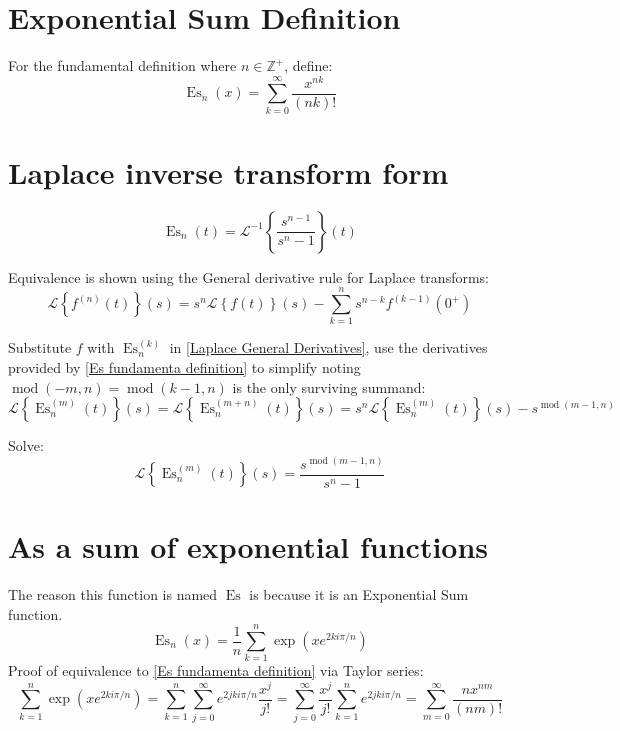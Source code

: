 \documentclass[]{article}
\DeclareMathOperator{\es}{Es}
\DeclareMathOperator{\md}{mod}
\newcommand{\pqty}[1]{{\left(#1\right)}}
\newcommand{\Bqty}[1]{{\left\{#1\right\}}}
\newcommand{\laplace}[1]{\mathcal{L}\Bqty{#1}\pqty{s}}
\newcommand{\laplaceInv}[1]{\mathcal{L}^{-1}\Bqty{#1}\pqty{t}}
\begin{document}
	\section{Exponential Sum Definition}
	For the fundamental definition where \(n\in\mathbb{Z}^+\), define:
	\begin{equation}
	\label{Es fundamenta definition}
	\es_n\pqty{x}=
	\sum_{k=0}^{\infty}\frac{x^{nk}}{\pqty{nk}!}
	\end{equation}
	
	\section{Laplace inverse transform form}
	\begin{equation}
	\es_n\pqty{t}=
	\laplaceInv{\frac{s^{n-1}}{s^n-1}}
	\end{equation}
	
	Equivalence is shown using the General derivative rule for Laplace transforms:
	\begin{equation}
	\label{Laplace General Derivatives}
	\laplace{f^{(n)}\pqty{t}}=
	s^n \laplace{f\pqty{t}} - \sum_{k=1}^{n} s^{n-k} f^{(k-1)}\pqty{0^{+}}
	\end{equation}
	
	Substitute \(f\) with \(\es_n^{(k)}\) in \eqref{Laplace General Derivatives}, use the derivatives provided by \eqref{Es fundamenta definition} to simplify noting \(\md\pqty{-m,n}=\md\pqty{k-1,n}\) is the only surviving summand:
	\begin{equation}
	\laplace{\es_n^{(m)}\pqty{t}}=
	\laplace{\es_n^{(m+n)}\pqty{t}}=
	s^n\laplace{\es_n^{(m)}\pqty{t}}-s^{\md\pqty{m-1,n}}
	\end{equation}
	
	Solve:
	\begin{equation}
	\laplace{\es_n^{(m)}\pqty{t}}=
	\frac{s^{\md\pqty{m-1,n}}}{s^n-1}
	\end{equation}
	
	
	
	\section{As a sum of exponential functions}
	The reason this function is named $\es$ is because it is an Exponential Sum function.
	\begin{equation}
	\label{Es Exponential sum form}
	\es_n\pqty{x}=
	\frac{1}{n}\sum _{k=1}^n \exp\pqty{xe^{2ki\pi/n}}
	\end{equation}
	Proof of equivalence to \eqref{Es fundamenta definition} via Taylor series:
	\begin{equation}
	\sum _{k=1}^n \exp\pqty{xe^{2ki\pi/n}}
	=
	\sum _{k=1}^n \sum _{j=0}^\infty e^{2jki\pi/n}\frac{x^j}{j!}
	=
	\sum _{j=0}^\infty \frac{x^j}{j!} \sum _{k=1}^n e^{2jki\pi/n}
	=
	\sum_{m=0}^{\infty}\frac{nx^{nm}}{\pqty{nm}!}
	\end{equation}
	
\end{document}
